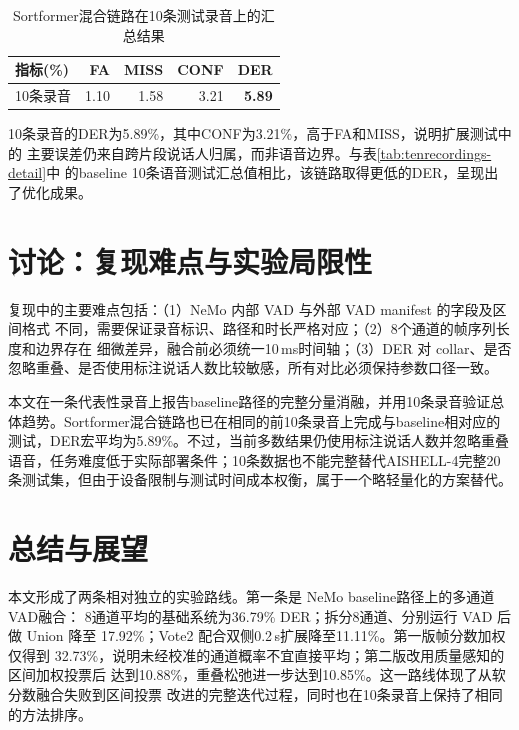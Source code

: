 \documentclass[UTF8,a4paper,10pt]{ctexart}
\begin{document}
\begin{table}[H]
\centering
\small
\caption{Sortformer混合链路在10条测试录音上的汇总结果}
\label{tab:sortformer-ten}
\begin{tabular}{lrrrr}
\toprule
指标(\%)& FA& MISS & CONF & DER\\
\midrule
10条录音 & 1.10 & 1.58 & 3.21 & \textbf{5.89}\\
\bottomrule
\end{tabular}
\end{table}

10条录音的DER为5.89\%，其中CONF为3.21\%，高于FA和MISS，说明扩展测试中的
主要误差仍来自跨片段说话人归属，而非语音边界。与表\ref{tab:tenrecordings-detail}中
的baseline 10条语音测试汇总值相比，该链路取得更低的DER，呈现出了优化成果。

\section{讨论：复现难点与实验局限性}

复现中的主要难点包括：（1）NeMo 内部 VAD 与外部 VAD manifest 的字段及区间格式
不同，需要保证录音标识、路径和时长严格对应；（2）8个通道的帧序列长度和边界存在
细微差异，融合前必须统一10\,ms时间轴；（3）DER 对 collar、是否忽略重叠、是否使用标注说话人数比较敏感，所有对比必须保持参数口径一致。



本文在一条代表性录音上报告baseline路径的完整分量消融，并用10条录音验证总体趋势。Sortformer混合链路也已在相同的前10条录音上完成与baseline相对应的测试，DER宏平均为5.89\%。不过，当前多数结果仍使用标注说话人数并忽略重叠语音，任务难度低于实际部署条件；10条数据也不能完整替代AISHELL-4完整20条测试集，但由于设备限制与测试时间成本权衡，属于一个略轻量化的方案替代。

\section{总结与展望}

本文形成了两条相对独立的实验路线。第一条是 NeMo baseline路径上的多通道VAD融合：
8通道平均的基础系统为36.79\% DER；拆分8通道、分别运行 VAD 后做 Union 降至
17.92\%；Vote2 配合双侧0.2\,s扩展降至11.11\%。第一版帧分数加权仅得到
32.73\%，说明未经校准的通道概率不宜直接平均；第二版改用质量感知的区间加权投票后
达到10.88\%，重叠松弛进一步达到10.85\%。这一路线体现了从软分数融合失败到区间投票
改进的完整迭代过程，同时也在10条录音上保持了相同的方法排序。
\end{document}
